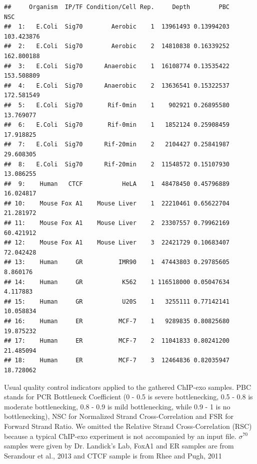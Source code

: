 \documentclass{bmcart}\usepackage[]{graphicx}\usepackage[]{color}
\makeatletter
\newenvironment{kframe}{%
 \def\at@end@of@kframe{}%
 \ifinner\ifhmode%
  \def\at@end@of@kframe{\end{minipage}}%
  \begin{minipage}{\columnwidth}%
 \fi\fi%
 \def\FrameCommand##1{\hskip\@totalleftmargin \hskip-\fboxsep
 \colorbox{shadecolor}{##1}\hskip-\fboxsep
     \hskip-\linewidth \hskip-\@totalleftmargin \hskip\columnwidth}%
 \MakeFramed {\advance\hsize-\width
   \@totalleftmargin\z@ \linewidth\hsize
   \@setminipage}}%
 {\par\unskip\endMakeFramed%
 \at@end@of@kframe}
\newenvironment{knitrout}{}{} %
\newcommand{\sig}{\sigma^{70}}
\makeatother
\begin{document}
\begin{table}[h!]
  \centering

\begin{knitrout}
\color{fgcolor}\begin{kframe}
\begin{verbatim}
##     Organism  IP/TF Condition/Cell Rep.     Depth        PBC        NSC
##  1:   E.Coli  Sig70        Aerobic    1  13961493 0.13994203 103.423876
##  2:   E.Coli  Sig70        Aerobic    2  14810838 0.16339252 162.800188
##  3:   E.Coli  Sig70      Anaerobic    1  16108774 0.13535422 153.508809
##  4:   E.Coli  Sig70      Anaerobic    2  13636541 0.15322537 172.581549
##  5:   E.Coli  Sig70       Rif-0min    1    902921 0.26895580  13.769077
##  6:   E.Coli  Sig70       Rif-0min    1   1852124 0.25908459  17.918825
##  7:   E.Coli  Sig70      Rif-20min    2   2104427 0.25841987  29.608305
##  8:   E.Coli  Sig70      Rif-20min    2  11548572 0.15107930  13.086255
##  9:    Human   CTCF           HeLA    1  48478450 0.45796889  16.024817
## 10:    Mouse Fox A1    Mouse Liver    1  22210461 0.65622704  21.281972
## 11:    Mouse Fox A1    Mouse Liver    2  23307557 0.79962169  60.421912
## 12:    Mouse Fox A1    Mouse Liver    3  22421729 0.10683407  72.042428
## 13:    Human     GR          IMR90    1  47443803 0.29785605   8.860176
## 14:    Human     GR           K562    1 116518000 0.05047634   4.117883
## 15:    Human     GR           U20S    1   3255111 0.77142141  10.058834
## 16:    Human     ER          MCF-7    1   9289835 0.80825680  19.875232
## 17:    Human     ER          MCF-7    2  11041833 0.80241200  21.485094
## 18:    Human     ER          MCF-7    3  12464836 0.82035947  18.728062
\end{verbatim}
\end{kframe}
\end{knitrout}
\caption{Usual quality control indicators applied to the gathered
  ChIP-exo samples.  PBC stands for PCR Bottleneck Coefficient (0 -
  0.5 is severe bottlenecking, 0.5 - 0.8 is moderate bottlenecking,
  0.8 - 0.9 is mild bottlenecking, while 0.9 - 1 is no bottlenecking),
  NSC for Normalized Strand Cross-Correlation and FSR for Forward
  Strand Ratio. We omitted the Relative Strand Cross-Correlation (RSC)
  because a typical ChIP-exo experiment is not accompanied by an input
  file. $\sig$ samples were given by Dr. Landick's Lab, FoxA1 and ER
  samples are from Serandour et al., 2013 \cite{exoillumina} and CTCF
  sample is from Rhee and Pugh, 2011 \cite{exo1}}
  \label{tab:qc} %
\end{table}
\end{document}
